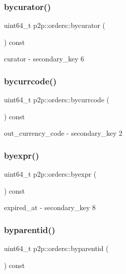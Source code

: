 \subsubsection{\texorpdfstring{bycurator()}{bycurator()}}
{\footnotesize\ttfamily uint64\+\_\+t p2p\+::orders\+::bycurator (\begin{DoxyParamCaption}{ }\end{DoxyParamCaption}) const\hspace{0.3cm}{\ttfamily [inline]}}

curator -\/ secondary\+\_\+key 6 \mbox{\label{structp2p_1_1orders_ab6f05a725122c94d3f2dcfaf24322c47}} 
\subsubsection{\texorpdfstring{bycurrcode()}{bycurrcode()}}
{\footnotesize\ttfamily uint64\+\_\+t p2p\+::orders\+::bycurrcode (\begin{DoxyParamCaption}{ }\end{DoxyParamCaption}) const\hspace{0.3cm}{\ttfamily [inline]}}

out\+\_\+currency\+\_\+code -\/ secondary\+\_\+key 2 \mbox{\label{structp2p_1_1orders_a8cf94dfb0902511c6baae1dd0434dcbf}} 
\subsubsection{\texorpdfstring{byexpr()}{byexpr()}}
{\footnotesize\ttfamily uint64\+\_\+t p2p\+::orders\+::byexpr (\begin{DoxyParamCaption}{ }\end{DoxyParamCaption}) const\hspace{0.3cm}{\ttfamily [inline]}}

expired\+\_\+at -\/ secondary\+\_\+key 8 \mbox{\label{structp2p_1_1orders_a2b790da517561e8a593b6c56d63c4cfd}} 
\subsubsection{\texorpdfstring{byparentid()}{byparentid()}}
{\footnotesize\ttfamily uint64\+\_\+t p2p\+::orders\+::byparentid (\begin{DoxyParamCaption}{ }\end{DoxyParamCaption}) const\hspace{0.3cm}{\ttfamily [inline]}}

